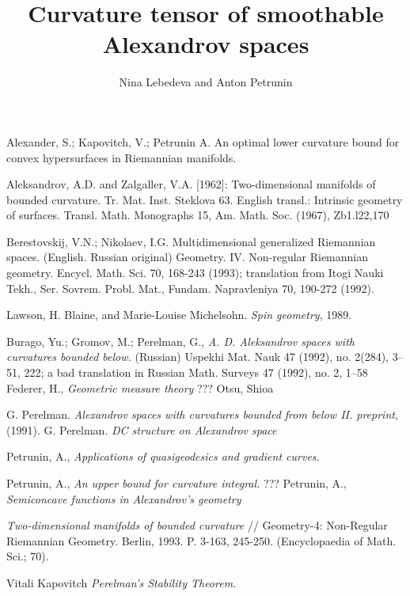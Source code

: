 \documentclass[a4paper,10pt]{article}
\begin{document}
\title{Curvature tensor of smoothable Alexandrov spaces}
\author{Nina Lebedeva and Anton Petrunin}
\maketitle









\begin{thebibliography}{52}
 Alexander, S.; Kapovitch, V.; Petrunin A.
An optimal lower curvature bound for convex hypersurfaces in Riemannian manifolds.


Aleksandrov, A.D. and Zalgaller, V.A. [1962]: Two-dimensional manifolds of bounded curvature.
Tr. Mat. Inst. Steklova 63. English transl.: Intrinsic geometry of surfaces. Transl. Math. Monographs
15, Am. Math. Soc. (1967), Zb1.l22,170


Berestovskij, V.N.; Nikolaev, I.G.
Multidimensional generalized Riemannian spaces. (English. Russian original)
Geometry. IV. Non-regular Riemannian geometry. Encycl. Math. Sci. 70, 168-243 (1993); translation from Itogi Nauki Tekh., Ser. Sovrem. Probl. Mat., Fundam. Napravleniya 70, 190-272 (1992).

 Lawson, H. Blaine, and Marie-Louise Michelsohn. \emph{Spin geometry}, 1989.


 Burago, Yu.; Gromov, M.; Perelman, G., \textit{A. D. Aleksandrov spaces
with curvatures bounded below.} (Russian)  Uspekhi Mat. Nauk  47  (1992),  no.
2(284), 3--51, 222;  a bad translation in  Russian Math. Surveys  47  (1992),  no. 2, 1--58
Federer, H., \textit{Geometric measure theory} ???
Otsu, Shioa

 G. Perelman. \textit{Alexandrov spaces with curvatures bounded from below II. preprint}, (1991).
 G. Perelman. \textit{DC structure on Alexandrov space}

 Petrunin, A., \textit{Applications of quasigeodesics
and gradient curves.}

 Petrunin, A., \textit{An upper bound for curvature integral.} ???
 Petrunin, A., \textit{Semiconcave functions in Alexandrov's geometry}




 \textit{ Two-dimensional manifolds of bounded curvature} // Geometry-4: Non-Regular Riemannian Geometry. Berlin, 1993. P. 3-163, 245-250. (Encyclopaedia of Math. Sci.; 70). 

Vitali Kapovitch \textit{Perelman's Stability Theorem.}
\end{thebibliography}
\end{document}
